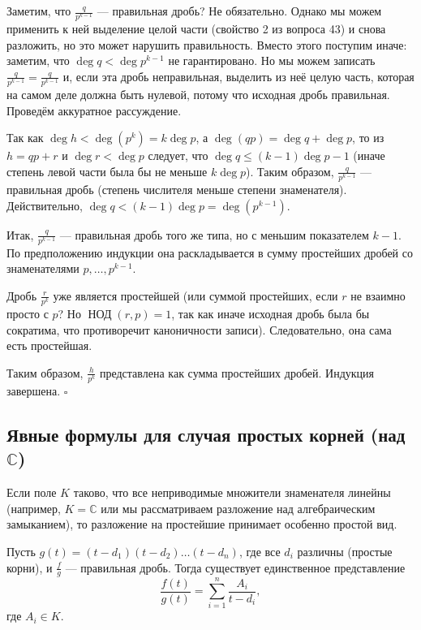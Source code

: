 \documentclass[a4paper,12pt]{article}
\theoremstyle{definition}
\theoremstyle{plain}
\theoremstyle{remark}
\begin{document}
	Заметим, что \( \frac{q}{p^{k-1}} \) — правильная дробь? Не обязательно. Однако мы можем применить к ней выделение целой части (свойство 2 из вопроса 43) и снова разложить, но это может нарушить правильность. Вместо этого поступим иначе: заметим, что \( \deg q < \deg p^{k-1} \) не гарантировано. Но мы можем записать \( \frac{q}{p^{k-1}} = \frac{q}{p^{k-1}} \) и, если эта дробь неправильная, выделить из неё целую часть, которая на самом деле должна быть нулевой, потому что исходная дробь правильная. Проведём аккуратное рассуждение.
	
	Так как \( \deg h < \deg(p^k) = k \deg p \), а \( \deg(q p) = \deg q + \deg p \), то из \( h = q p + r \) и \( \deg r < \deg p \) следует, что \( \deg q \leq (k-1)\deg p - 1 \) (иначе степень левой части была бы не меньше \( k \deg p \)). Таким образом, \( \frac{q}{p^{k-1}} \) — правильная дробь (степень числителя меньше степени знаменателя). Действительно, \( \deg q < (k-1)\deg p = \deg(p^{k-1}) \).
	
	Итак, \( \frac{q}{p^{k-1}} \) — правильная дробь того же типа, но с меньшим показателем \( k-1 \). По предположению индукции она раскладывается в сумму простейших дробей со знаменателями \( p, \dots, p^{k-1} \).
	
	Дробь \( \frac{r}{p^k} \) уже является простейшей (или суммой простейших, если \( r \) не взаимно просто с \( p \)? Но \( \operatorname{НОД}(r, p) = 1 \), так как иначе исходная дробь была бы сократима, что противоречит каноничности записи). Следовательно, она сама есть простейшая.
	
	Таким образом, \( \frac{h}{p^k} \) представлена как сумма простейших дробей. Индукция завершена. \hfill \(\square\)
	
	\subsection{Явные формулы для случая простых корней (над \( \mathbb{C} \))}
	
	Если поле \( K \) таково, что все неприводимые множители знаменателя линейны (например, \( K = \mathbb{C} \) или мы рассматриваем разложение над алгебраическим замыканием), то разложение на простейшие принимает особенно простой вид.
	
	Пусть \( g(t) = (t - d_1)(t - d_2)\dots(t - d_n) \), где все \( d_i \) различны (простые корни), и \( \frac{f}{g} \) — правильная дробь. Тогда существует единственное представление
	\[
	\frac{f(t)}{g(t)} = \sum_{i=1}^n \frac{A_i}{t - d_i},
	\]
	где \( A_i \in K \).
	
\end{document}
